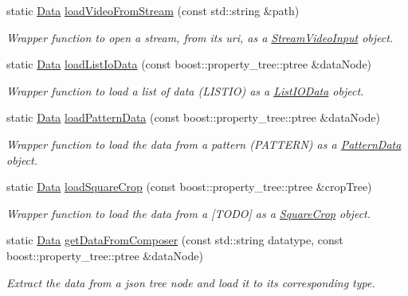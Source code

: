 \begin{DoxyCompactItemize}
static \hyperlink{classfilter_1_1data_1_1_data}{Data} \hyperlink{classfilter_1_1data_1_1_composer_a6bdfb001ccac438b950edb1b6a14abe3}{load\+Video\+From\+Stream} (const std\+::string \&path)
\begin{DoxyCompactList}\small\item\em Wrapper function to open a stream, from its uri, as a \hyperlink{classfilter_1_1data_1_1_stream_video_input}{Stream\+Video\+Input} object. \end{DoxyCompactList}\item 
static \hyperlink{classfilter_1_1data_1_1_data}{Data} \hyperlink{classfilter_1_1data_1_1_composer_abd8c9f50c61149aaa0ed8c2068afd3ff}{load\+List\+Io\+Data} (const boost\+::property\+\_\+tree\+::ptree \&data\+Node)
\begin{DoxyCompactList}\small\item\em Wrapper function to load a list of data (L\+I\+S\+T\+IO) as a \hyperlink{classfilter_1_1data_1_1_list_i_o_data}{List\+I\+O\+Data} object. \end{DoxyCompactList}\item 
static \hyperlink{classfilter_1_1data_1_1_data}{Data} \hyperlink{classfilter_1_1data_1_1_composer_a6dd5029c65c516d78098ddd4cd2bd389}{load\+Pattern\+Data} (const boost\+::property\+\_\+tree\+::ptree \&data\+Node)
\begin{DoxyCompactList}\small\item\em Wrapper function to load the data from a pattern (P\+A\+T\+T\+E\+RN) as a \hyperlink{classfilter_1_1data_1_1_pattern_data}{Pattern\+Data} object. \end{DoxyCompactList}\item 
static \hyperlink{classfilter_1_1data_1_1_data}{Data} \hyperlink{classfilter_1_1data_1_1_composer_a2ec970442fd0b77b6bd91b4a0f6ee561}{load\+Square\+Crop} (const boost\+::property\+\_\+tree\+::ptree \&crop\+Tree)
\begin{DoxyCompactList}\small\item\em Wrapper function to load the data from a \mbox{[}T\+O\+DO\mbox{]} as a \hyperlink{classfilter_1_1data_1_1_square_crop}{Square\+Crop} object. \end{DoxyCompactList}\item 
static \hyperlink{classfilter_1_1data_1_1_data}{Data} \hyperlink{classfilter_1_1data_1_1_composer_a8cd1c9f8d5f54bbc93d92d26ecb3d85a}{get\+Data\+From\+Composer} (const std\+::string datatype, const boost\+::property\+\_\+tree\+::ptree \&data\+Node)
\begin{DoxyCompactList}\small\item\em Extract the data from a json tree node and load it to its corresponding type. \end{DoxyCompactList}\item 

\end{DoxyCompactItemize}
